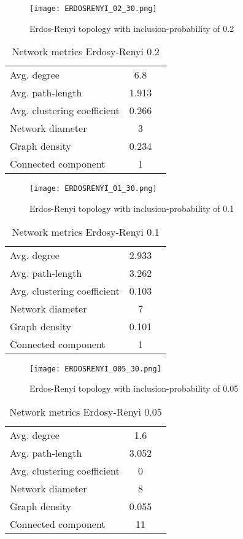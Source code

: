 \documentclass[Bachelorarbeit.tex]{subfiles}
\begin{document}
\begin{figure}[H]
	\centering
  \texttt{[image: ERDOSRENYI\_02\_30.png]}
	\caption{Erdos-Renyi topology with inclusion-probability of 0.2}
	\label{fig:topology_ERDOSRENYI_02_30}
\end{figure}

\begin{table}[h]
	\centering
	\caption{Network metrics Erdosy-Renyi 0.2}
	\begin{tabular} { l c r }
		\hline
		Avg. degree & 6.8 \\
		Avg. path-length & 1.913 \\
		Avg. clustering coefficient &  0.266 \\
		Network diameter & 3 \\
		Graph density & 0.234 \\
		Connected component & 1 \\
		\hline
	\end{tabular}
\end{table}

\begin{figure}[H]
	\centering
  \texttt{[image: ERDOSRENYI\_01\_30.png]}
	\caption{Erdos-Renyi topology with inclusion-probability of 0.1}
	\label{fig:topology_ERDOSRENYI_01_30}
\end{figure}

\begin{table}[h]
	\centering
	\caption{Network metrics Erdosy-Renyi 0.1}
	\begin{tabular} { l c r }
		\hline
		Avg. degree & 2.933 \\
		Avg. path-length & 3.262 \\
		Avg. clustering coefficient & 0.103 \\
		Network diameter & 7 \\
		Graph density & 0.101 \\
		Connected component & 1 \\
		\hline
	\end{tabular}
\end{table}

\begin{figure}[H]
	\centering
  \texttt{[image: ERDOSRENYI\_005\_30.png]}
	\caption{Erdos-Renyi topology with inclusion-probability of 0.05}
	\label{fig:topology_ERDOSRENYI_005_30}
\end{figure}

\begin{table}[h]
	\centering
	\caption{Network metrics Erdosy-Renyi 0.05}
	\begin{tabular} { l c r }
		\hline
		Avg. degree & 1.6 \\
		Avg. path-length & 3.052 \\
		Avg. clustering coefficient & 0 \\
		Network diameter & 8 \\
		Graph density & 0.055 \\
		Connected component & 11 \\
		\hline
	\end{tabular}
\end{table}
\end{document}
